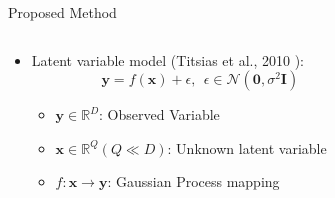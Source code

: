 \documentclass[final,hyperref={pdfpagelabels=false}]{beamer}
\begin{document}
\begin{frame}[t]
\begin{columns}[t]
\begin{column}{0.96\linewidth}
\begin{block}{Proposed Method}
\begin{columns}[t]
\begin{column}{0.33\linewidth}
          \begin{columns}
            \begin{column}{0.8\textwidth}
              \begin{itemize}
                \item Latent variable model (Titsias et al., 2010 \footnotemark[4]):
                  \begin{equation*}
                    \mathbf{y} = f(\mathbf{x}) + \epsilon,~~\epsilon \in \mathcal{N}(\mathbf{0}, \sigma^2 \mathbf{I})
                  \end{equation*}
                  \begin{itemize}
                    \item $\mathbf{y} \in \mathbb{R}^D$: Observed Variable
                    \item $\mathbf{x} \in \mathbb{R}^Q (Q \ll D)$: Unknown latent variable
                    \item $f: \mathbf{x} \rightarrow \mathbf{y}$: Gaussian Process mapping
                  \end{itemize}
              \end{itemize}
            \end{column}
            \begin{column}{0.2\textwidth}
              \begin{figure}
                \centering

\end{figure}
\end{column}
\end{columns}
\end{column}
\end{columns}
\end{block}
\end{column}
\end{columns}
\end{frame}
\end{document}
